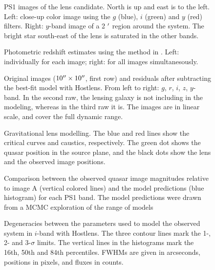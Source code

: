 \documentclass[manuscript]{aastex}
\begin{document}
\begin{figure}
\caption{
PS1 images of the lens candidate. North is up and east is to the left. Left: close-up color image using the $g$ (blue), $i$ (green) and $y$ (red) filters. Right: $y$-band image of a 2 $\mbox{$^\prime$}$ region around the system. The bright star south-east of the lens is saturated in the other bands.}
\label{lens}
\end{figure}



\begin{figure}
\caption{
Photometric redshift estimates using the method in \citet{wu10}. 
Left: individually for each image; right: for all images simultanesously.}
\label{redshift}
\end{figure}


\begin{figure}
\caption{
Original images ($10\mbox{$^{\prime\prime}$}\times10\mbox{$^{\prime\prime}$}$, first row) and residuals after subtracting the best-fit model with Hostlens. From left to right: $g$, $r$, $i$, $z$, $y$-band. In the second raw, the lensing galaxy is not including in the modeling, whereas in the third raw it is. The images are in linear scale, and cover the full dynamic range.}
\label{hostlensi}
\end{figure}


\begin{figure}
\caption{
Gravitational lens modelling. The blue and red lines show the critical curves and caustics, respectively. The green dot shows the quasar position in the source plane, and the black dots show the lens and the observed image positions.}
\label{model}
\end{figure}


\begin{figure}
\caption{
Comparison between the observed quasar image magnitudes relative to image A (vertical colored lines) and the model predictions (blue histogram) for each PS1 band. The model predictions were drawn from a MCMC exploration of the range of models}
\label{modelphot}
\end{figure}

\begin{figure}
\caption{
Degeneracies between the parameters used to model the observed system in $i$-band with Hostlens. The three contour lines mark the 1-, 2- and 3-$\sigma$ limits. The vertical lines in the histograms mark the 16th, 50th and 84th percentiles. FWHMs are given in arcseconds, positions in pixels, and fluxes in counts.}
\label{mcmc_hostlens}
\end{figure}
\end{document}
